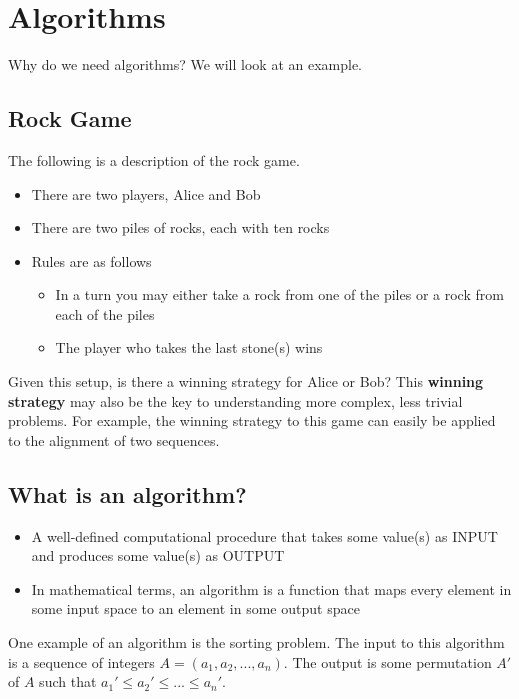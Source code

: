 \documentclass[10pt]{article}
\newenvironment{mitemize}
{
  \begin{itemize}
  \setlength{\itemsep}{1pt}
  \setlength{\parskip}{0pt}
  \setlength{\parsep}{0pt}}{\end{itemize}
}
\begin{document}
\section*{Algorithms}
Why do we need algorithms? We will look at an example.

\subsection*{Rock Game}
The following is a description of the rock game.
\begin{mitemize}
\item There are two players, Alice and Bob
\item There are two piles of rocks, each with ten rocks
\item Rules are as follows
  \begin{mitemize}
  \item In a turn you may either take a rock from one of the piles or a rock from each of the piles
  \item The player who takes the last stone(s) wins
  \end{mitemize}
\end{mitemize}

Given this setup, is there a winning strategy for Alice or Bob? This \textbf{winning strategy} may also be the key to understanding more complex, less trivial problems. For example, the winning strategy to this game can easily be applied to the alignment of two sequences.

\subsection*{What is an algorithm?}
\begin{mitemize}
\item A well-defined computational procedure that takes some value(s) as INPUT and produces some value(s) as OUTPUT
\item In mathematical terms, an algorithm is a function that maps every element in some input space to an element in some output space
\end{mitemize}

One example of an algorithm is the sorting problem. The input to this algorithm is a sequence of integers $A = (a_1, a_2, ..., a_n)$. The output is some permutation $A'$ of $A$ such that $a_1' \leq a_2' \leq ... \leq a_n'$.
\end{document}
